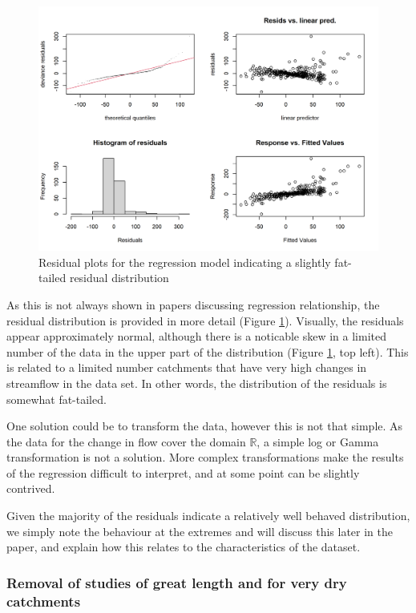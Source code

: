 \documentclass[]{elsarticle} %
\begin{document}
\begin{figure}
\includegraphics[width=0.9\linewidth]{residual_plot_model_all} \caption{Residual plots for the regression model indicating a slightly fat-tailed residual distribution}\label{fig:gamcheckmodelall}
\end{figure}

As this is not always shown in papers discussing regression relationship, the residual distribution is provided in more detail (Figure \ref{fig:gamcheckmodelall}). Visually, the residuals appear approximately normal, although there is a noticable skew in a limited number of the data in the upper part of the distribution (Figure \ref{fig:gamcheckmodelall}, top left). This is related to a limited number catchments that have very high changes in streamflow in the data set. In other words, the distribution of the residuals is somewhat fat-tailed.

One solution could be to transform the data, however this is not that simple. As the data for the change in flow cover the domain \(\mathbb{R}\), a simple log or Gamma transformation is not a solution. More complex transformations make the results of the regression difficult to interpret, and at some point can be slightly contrived.

Given the majority of the residuals indicate a relatively well behaved distribution, we simply note the behaviour at the extremes and will discuss this later in the paper, and explain how this relates to the characteristics of the dataset.

\hypertarget{removal-of-studies-of-great-length-and-for-very-dry-catchments}{%
\subsubsection{Removal of studies of great length and for very dry catchments}\label{removal-of-studies-of-great-length-and-for-very-dry-catchments}}
\end{document}

